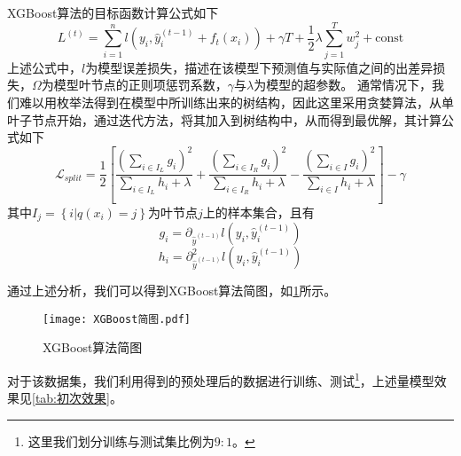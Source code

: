 \documentclass{MathorCupModeling}
\begin{document}
		XGBoost算法的目标函数计算公式如下
		\begin{equation}
			L^{\left(t\right)}=\sum\limits_{i=1}^{n}l\left(y_i,\hat{y}_{i}^{\left(t-1\right)}+f_t\left(x_i\right)\right)+\gamma T+\frac{1}{2}\lambda\sum\limits_{j=1}^T{w_j^2}+\mathrm{const} \label{fXGBoostL}
		\end{equation}
		上述公式中，$l$为模型误差损失，描述在该模型下预测值与实际值之间的出差异损失，$\Omega$为模型叶节点的正则项惩罚系数，$\gamma$与$\lambda$为模型的超参数\textcolor{blue}{\cite{pxgboost2}}。
		通常情况下，我们难以用枚举法得到在模型中所训练出来的树结构，因此这里采用贪婪算法，从单叶子节点开始，通过迭代方法，将其加入到树结构中，从而得到最优解，其计算公式\textcolor{blue}{\cite{pxgboost3}}如下
		\begin{equation}
			\mathcal{L}_{split}=\frac{1}{2}\left[\frac{\left(\sum_{i\in I_L}g_i\right)^2}{\sum_{i\in I_L}h_i+\lambda}+\frac{\left(\sum_{i\in I_R}g_i\right)^2}{\sum_{i\in I_R}h_i+\lambda}-\frac{\left(\sum_{i\in I}g_i\right)^2}{\sum_{i\in I}h_i+\lambda}\right]-\gamma \label{fXGBoostLsplit}
		\end{equation}
		其中$I_j=\left\{i|q\left(x_i\right)=j\right\}$为叶节点$j$上的样本集合\textcolor{blue}{\cite{pxgboost2}}，且有
		\begin{equation}
			g_i=\partial_{\hat{y}^{\left(t-1\right)}}l\left(y_i,\hat{y}_i^{\left(t-1\right)}\right) \label{xgboostgi}
		\end{equation}
		\begin{equation}
			h_i=\partial_{\hat{y}^{\left(t-1\right)}}^2l\left(y_i,\hat{y}_i^{\left(t-1\right)}\right) \label{xgboosthi}
		\end{equation}
	
		通过上述分析，我们可以得到XGBoost算法简图，如\textcolor{blue}{\cref{fig:XGBoost}}所示。
		\begin{figure}[H]
			\centerline{\texttt{[image: XGBoost简图.pdf]}}
			\caption{XGBoost算法简图}\label{fig:XGBoost}
		\end{figure}

	对于该数据集，我们利用得到的预处理后的数据进行训练、测试\textcolor{blue}{\footnote{这里我们划分训练与测试集比例为$9:1$。}}，上述量模型效果见\textcolor{blue}{\cref{tab:初次效果}}。
\begin{table}[H]
	\centering
	\caption{RF与XGBoost初次学习效果}
	\label{tab:初次效果}
\end{table}
\end{document}
